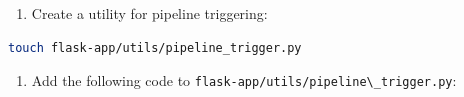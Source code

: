 \documentclass[
  screen,review,acmlarge]{acmart}
\newcommand{\passthrough}[1]{#1}
\providecommand{\tightlist}{%
  \setlength{\itemsep}{0pt}\setlength{\parskip}{0pt}}
\begin{document}
\begin{enumerate}
\def\labelenumi{\arabic{enumi}.}
\setcounter{enumi}{1}
\tightlist
\item
  Create a utility for pipeline triggering:
\end{enumerate}

\begin{lstlisting}[language=bash]
touch flask-app/utils/pipeline_trigger.py
\end{lstlisting}

\begin{enumerate}
\def\labelenumi{\arabic{enumi}.}
\setcounter{enumi}{2}
\tightlist
\item
  Add the following code to \passthrough{\lstinline!flask-app/utils/pipeline\_trigger.py!}:
\end{enumerate}
\end{document}
